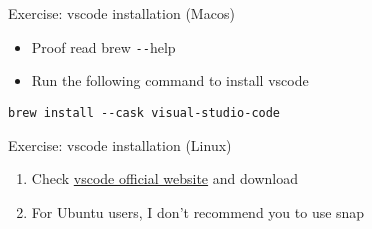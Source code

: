 \begin{frame}[fragile]{Exercise: vscode installation (Macos)}
\begin{itemize}
	\item Proof read brew \verb|--|help
	\item Run the following command to install vscode
\end{itemize}

	\begin{verbatim}
brew install --cask visual-studio-code
	\end{verbatim}

\end{frame}

\begin{frame}[fragile]{Exercise: vscode installation (Linux)}
	\begin{enumerate}
		\item Check \href{https://code.visualstudio.com/docs/setup/linux}{vscode official website} and download
		\item For Ubuntu users, I don't recommend you to use snap
	\end{enumerate}
\end{frame}
